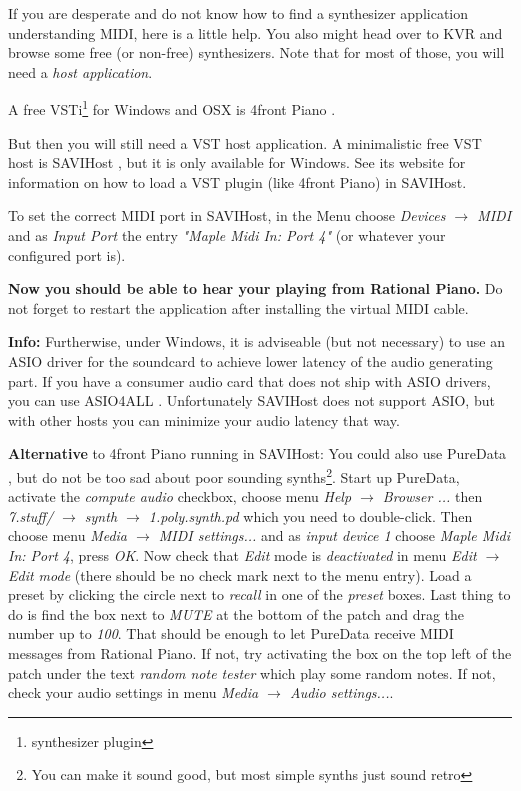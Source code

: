 \documentclass[12pt,a4paper,titlepage,oneside]{report}
\begin{document}
If you are desperate and do not know how to find a synthesizer application understanding MIDI, here is a little help. You also might head over to KVR \cite{bib:kvr} and browse some free (or non-free) synthesizers. Note that for most of those, you will need a \textit{host application}.

A free VSTi\footnote{synthesizer plugin} for Windows and OSX is 4front Piano \cite{bib:4front}.

But then you will still need a VST host application. A minimalistic free VST host is SAVIHost \cite{bib:savi}, but it is only available for Windows. See its website for information on how to load a VST plugin (like 4front Piano) in SAVIHost.

To set the correct MIDI port in SAVIHost, in the Menu choose \textit{Devices $\rightarrow$ MIDI} and as \textit{Input Port} the entry \textit{"Maple Midi In: Port 4"} (or whatever your configured port is).

\textbf{Now you should be able to hear your playing from Rational Piano.} Do not forget to restart the application after installing the virtual MIDI cable.

\textbf{Info:} Furtherwise, under Windows, it is adviseable (but not necessary) to use an ASIO driver for the soundcard to achieve lower latency of the audio generating part. If you have a consumer audio card that does not ship with ASIO drivers, you can use ASIO4ALL \cite{bib:asio4all}. Unfortunately SAVIHost does not support ASIO, but with other hosts you can minimize your audio latency that way.

\textbf{Alternative} to 4front Piano running in SAVIHost: You could also use PureData \cite{bib:puredata}, but do not be too sad about poor sounding synths\footnote{You can make it sound good, but most simple synths just sound retro}. Start up PureData, activate the \textit{compute audio} checkbox, choose menu \textit{Help $\rightarrow$ Browser ...} then \textit{7.stuff/ $\rightarrow$ synth $\rightarrow$ 1.poly.synth.pd} which you need to double-click. Then choose menu \textit{Media $\rightarrow$ MIDI settings...} and as \textit{input device 1} choose \textit{Maple Midi In: Port 4}, press \textit{OK}. Now check that \textit{Edit} mode is \textit{deactivated} in menu \textit{Edit $\rightarrow$ Edit mode} (there should be no check mark next to the menu entry). Load a preset by clicking the circle next to \textit{recall} in one of the \textit{preset} boxes. Last thing to do is find the box next to \textit{MUTE} at the bottom of the patch and drag the number up to \textit{100}. That should be enough to let PureData receive MIDI messages from Rational Piano. If not, try activating the box on the top left of the patch under the text \textit{random note tester} which play some random notes. If not, check your audio settings in menu \textit{Media $\rightarrow$ Audio settings...}.
\end{document}
